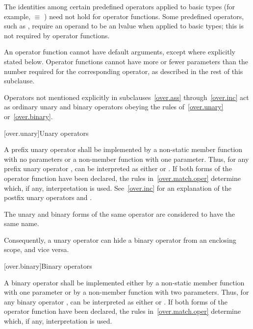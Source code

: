 \pnum
{}%
The identities among certain predefined operators applied to basic types
(for example,
 $\equiv$
)
need not hold for operator functions.
Some predefined operators, such as
\tcode{+=},
require an operand to be an lvalue when applied to basic types;
this is not required by operator functions.

\pnum
{}%
An operator function cannot have default arguments,
except where explicitly stated below.
Operator
functions cannot have more or fewer parameters than the
number required for the corresponding operator, as
described in the rest of this subclause.

\pnum
Operators not mentioned explicitly in subclauses~\ref{over.ass} through~\ref{over.inc}
act as ordinary unary and binary
operators obeying the rules of~\ref{over.unary} or~\ref{over.binary}.%
%

[over.unary]{Unary operators}%
%

\pnum
A prefix unary operator shall be implemented by a
non-static member function with no parameters or a
non-member function with one parameter.
%
Thus, for any prefix unary operator
,
can be interpreted as either
or
.
If both forms of the operator function have been declared,
the rules in~\ref{over.match.oper} determine which, if any, interpretation is
used.
See~\ref{over.inc} for an explanation of the postfix unary operators
\tcode{++}
and
\tcode{\dcr}.

\pnum
The unary and binary forms of the same operator are considered to have
the same name.
\begin{note}
Consequently, a unary operator can hide a binary
operator from an enclosing scope, and vice versa.
\end{note}

[over.binary]{Binary operators}%
%

\pnum
A binary operator shall be implemented either by a non-static member
function
with one parameter or by a non-member function with two parameters.
%
Thus, for any binary operator
,
can be interpreted as either
or
.
If both forms of the operator function have been declared,
the rules in~\ref{over.match.oper} determine which, if any, interpretation is
used.


